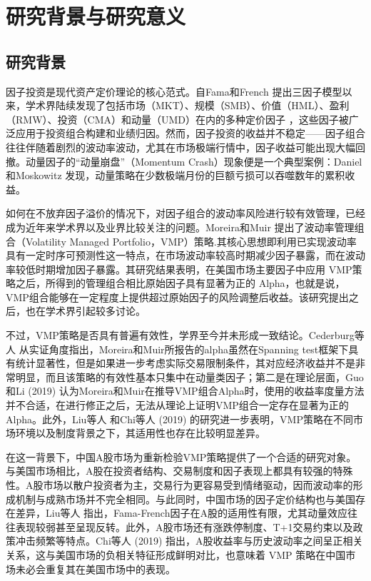 \documentclass[
    decl-page,
    oneside,
  ]{njuthesis}
\begin{document}
\section{研究背景与研究意义}

\subsection{研究背景}

因子投资是现代资产定价理论的核心范式。自Fama和French \cite{fama1993common} 提出三因子模型以来，学术界陆续发现了包括市场（MKT）、规模（SMB）、价值（HML）、盈利（RMW）、投资（CMA）和动量（UMD）在内的多种定价因子 \cite{fama2015five,carhart1997persistence,jegadeesh1993returns}，这些因子被广泛应用于投资组合构建和业绩归因。然而，因子投资的收益并不稳定——因子组合往往伴随着剧烈的波动率波动，尤其在市场极端行情中，因子收益可能出现大幅回撤。动量因子的“动量崩盘”（Momentum Crash）现象便是一个典型案例：Daniel和Moskowitz \cite{daniel2016momentum} 发现，动量策略在少数极端月份的巨额亏损可以吞噬数年的累积收益。

如何在不放弃因子溢价的情况下，对因子组合的波动率风险进行较有效管理，已经成为近年来学术界以及业界比较关注的问题。Moreira和Muir \cite{moreira2017volatility} 提出了波动率管理组合（Volatility Managed Portfolio，VMP）策略.其核心思想即利用已实现波动率具有一定时序可预测性这一特点，在市场波动率较高时期减少因子暴露，而在波动率较低时期增加因子暴露。其研究结果表明，在美国市场主要因子中应用 VMP策略之后，所得到的管理组合相比原始因子具有显著为正的 Alpha，也就是说，VMP组合能够在一定程度上提供超过原始因子的风险调整后收益。该研究提出之后，也在学术界引起较多讨论。

不过，VMP策略是否具有普遍有效性，学界至今并未形成一致结论。Cederburg等人 \cite{cederburg2020performance}从实证角度指出，Moreira和Muir所报告的alpha虽然在Spanning test框架下具有统计显著性，但是如果进一步考虑实际交易限制条件，其对应经济收益并不是非常明显，而且该策略的有效性基本只集中在动量类因子；第二是在理论层面，Guo和Li (2019) 认为Moreira和Muir在推导VMP组合Alpha时，使用的收益率度量方法并不合适，在进行修正之后，无法从理论上证明VMP组合一定存在显著为正的Alpha。此外，Liu等人 \cite{liu2019size} 和Chi等人 (2019) 的研究进一步表明，VMP策略在不同市场环境以及制度背景之下，其适用性也存在比较明显差异。

在这一背景下，中国A股市场为重新检验VMP策略提供了一个合适的研究对象。与美国市场相比，A股在投资者结构、交易制度和因子表现上都具有较强的特殊性。A股市场以散户投资者为主，交易行为更容易受到情绪驱动，因而波动率的形成机制与成熟市场并不完全相同。与此同时，中国市场的因子定价结构也与美国存在差异，Liu等人 \cite{liu2019size} 指出，Fama-French因子在A股的适用性有限，尤其动量效应往往表现较弱甚至呈现反转。此外，A股市场还有涨跌停制度、T+1交易约束以及政策冲击频繁等特点。Chi等人 (2019) 指出，A股收益率与历史波动率之间呈正相关关系，这与美国市场的负相关特征形成鲜明对比，也意味着 VMP 策略在中国市场未必会重复其在美国市场中的表现。
\end{document}
